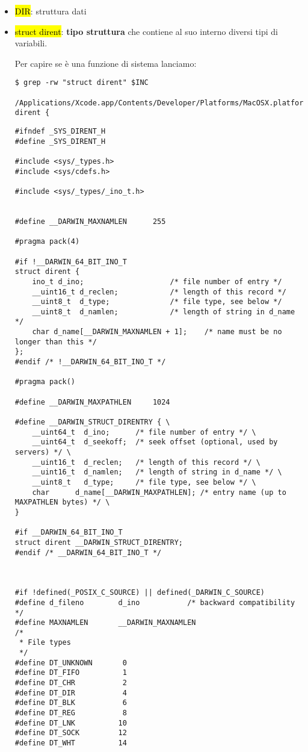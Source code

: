 \begin{itemize}
	\item \hl{DIR}: struttura dati
	\item \hl{struct dirent}: \textbf{tipo struttura} che contiene al suo interno diversi tipi di variabili. 
	
		Per capire se è una funzione di sistema lanciamo:
		
\begin{lstlisting}
$ grep -rw "struct dirent" $INC

/Applications/Xcode.app/Contents/Developer/Platforms/MacOSX.platform/Developer/SDKs/MacOSX.sdk/usr/include//sys/dirent.h:struct dirent {
\end{lstlisting}
		
\begin{lstlisting}
#ifndef _SYS_DIRENT_H
#define _SYS_DIRENT_H

#include <sys/_types.h>
#include <sys/cdefs.h>

#include <sys/_types/_ino_t.h>


#define __DARWIN_MAXNAMLEN      255

#pragma pack(4)

#if !__DARWIN_64_BIT_INO_T
struct dirent {
	ino_t d_ino;                    /* file number of entry */
	__uint16_t d_reclen;            /* length of this record */
	__uint8_t  d_type;              /* file type, see below */
	__uint8_t  d_namlen;            /* length of string in d_name */
	char d_name[__DARWIN_MAXNAMLEN + 1];    /* name must be no longer than this */
};
#endif /* !__DARWIN_64_BIT_INO_T */

#pragma pack()

#define __DARWIN_MAXPATHLEN     1024

#define __DARWIN_STRUCT_DIRENTRY { \
	__uint64_t  d_ino;      /* file number of entry */ \
	__uint64_t  d_seekoff;  /* seek offset (optional, used by servers) */ \
	__uint16_t  d_reclen;   /* length of this record */ \
	__uint16_t  d_namlen;   /* length of string in d_name */ \
	__uint8_t   d_type;     /* file type, see below */ \
	char      d_name[__DARWIN_MAXPATHLEN]; /* entry name (up to MAXPATHLEN bytes) */ \
}

#if __DARWIN_64_BIT_INO_T
struct dirent __DARWIN_STRUCT_DIRENTRY;
#endif /* __DARWIN_64_BIT_INO_T */



#if !defined(_POSIX_C_SOURCE) || defined(_DARWIN_C_SOURCE)
#define d_fileno        d_ino           /* backward compatibility */
#define MAXNAMLEN       __DARWIN_MAXNAMLEN
/*
 * File types
 */
#define DT_UNKNOWN       0
#define DT_FIFO          1
#define DT_CHR           2
#define DT_DIR           4
#define DT_BLK           6
#define DT_REG           8
#define DT_LNK          10
#define DT_SOCK         12
#define DT_WHT          14


\end{lstlisting}
\end{itemize}
